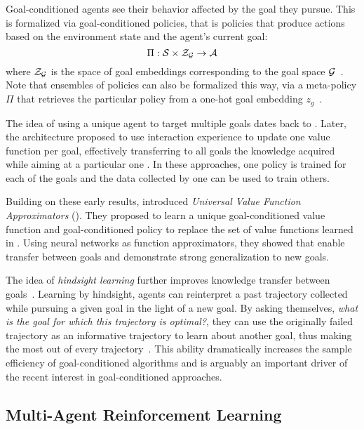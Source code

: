 Goal-conditioned agents see their behavior affected by the goal they pursue. This is formalized via goal-conditioned policies, that is policies that produce actions based on the environment state and the agent's current goal: 
\begin{equation}
\Pi:\mathcal{S}\times\mathcal{Z}_{\mathcal{G}}\to\mathcal{A}
\end{equation}
where $\mathcal{Z}_{\mathcal{G}}$ is the space of goal embeddings corresponding to the goal space $\mathcal{G}$~\citep{schaul2015universal}. Note that ensembles of policies can also be formalized this way, via a meta-policy $\Pi$ that retrieves the particular policy from a one-hot goal embedding $z_g$~\citep{kaelbling1993learning,sutton2011horde}.

The idea of using a unique \rl agent to target multiple goals dates back to \citep{kaelbling1993learning}. Later, the \horde architecture proposed to use interaction experience to update one value function per goal, effectively transferring to all goals the knowledge acquired while aiming at a particular one \cite{sutton2011horde}. In these approaches, one policy is trained for each of the goals and the data collected by one can be used to train others.

Building on these early results, \citet{schaul2015universal} introduced \textit{Universal Value Function Approximators} (\uvfa). They proposed to learn a unique goal-conditioned value function and goal-conditioned policy to replace the set of value functions learned in \horde. Using neural networks as function approximators, they showed that \uvfas enable transfer between goals and demonstrate strong generalization to new goals.

The idea of \textit{hindsight learning} further improves knowledge transfer between goals~\citep{kaelbling1993learning,andrychowicz2017hindsight}. Learning by hindsight, agents can reinterpret a past trajectory collected while pursuing a given goal in the light of a new goal. By asking themselves, \textit{what is the goal for which this trajectory is optimal?}, they can use the originally failed trajectory as an informative trajectory to learn about another goal, thus making the most out of every trajectory~\citep{eysenbach2020rewriting}. This ability dramatically increases the sample efficiency of goal-conditioned algorithms and is arguably an important driver of the recent interest in goal-conditioned \rl approaches.


\subsection{Multi-Agent Reinforcement Learning}

